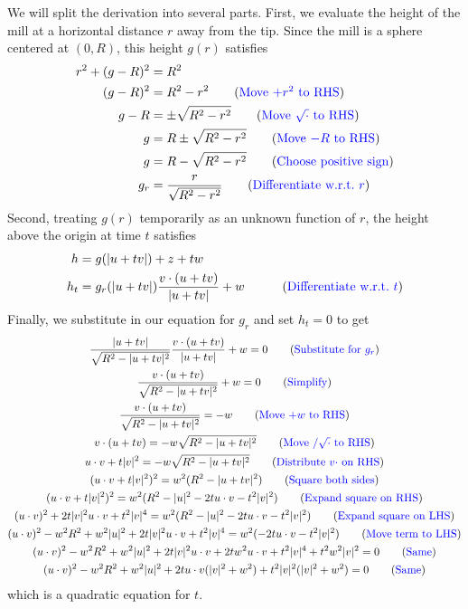 \documentclass[11pt]{article}
\newcommand{\blue}[1]{{\color{blue} #1}}
\newcommand{\move}[1]{\tag{\blue{#1}}}
\begin{document}
We will split the derivation into several parts.  First, we evaluate the height of the mill at a horizontal
distance $r$ away from the tip.  Since the mill is a sphere centered at $(0,R)$, this height $g(r)$ satisfies
\begin{align*}
r^2 + (g - R)^2 &= R^2 \\
(g - R)^2 &= R^2 - r^2 \move{Move $+r^2$ to RHS} \\
g - R &= \pm \sqrt{R^2 - r^2} \move{Move $\sqrt{\cdot}$ to RHS}\\
g &= R \pm \sqrt{R^2 - r^2} \move{Move $-R$ to RHS} \\
g &= R - \sqrt{R^2 - r^2} \move{Choose positive sign} \\
g_r &= \frac{r}{\sqrt{R^2 - r^2}} \move{Differentiate w.r.t.\ $r$}
\end{align*}
Second, treating $g(r)$ temporarily as an unknown function of $r$, the height above the origin at time $t$
satisfies
\begin{align*}
h &= g(|u+tv|) + z + tw \\
h_t &= g_r(|u+tv|) \frac{v \cdot (u + tv)}{|u+tv|} + w & \move{Differentiate w.r.t.\ $t$}
\end{align*}
Finally, we substitute in our equation for $g_r$ and set $h_t = 0$ to get
\begin{gather*}
\frac{|u+tv|}{\sqrt{R^2 - |u+tv|^2}} \frac{v \cdot (u+tv)}{|u+tv|} + w = 0 \move{Substitute for $g_r$} \\
\frac{v \cdot (u+tv)}{\sqrt{R^2 - |u+tv|^2}} + w = 0  \move{Simplify} \\
\frac{v \cdot (u+tv)}{\sqrt{R^2 - |u+tv|^2}} = -w \move{Move $+w$ to RHS} \\
v \cdot (u+tv) = -w \sqrt{R^2 - |u+tv|^2} \move{Move $/ \sqrt{\cdot}$ to RHS} \\
u\cdot v+t|v|^2 = -w \sqrt{R^2 - |u+tv|^2} \move{Distribute $v \cdot$ on RHS} \\
(u\cdot v+t|v|^2)^2 = w^2 (R^2 - |u+tv|^2) \move{Square both sides} \\
(u\cdot v+t|v|^2)^2 = w^2 (R^2 - |u|^2 - 2tu\cdot v - t^2|v|^2) \move{Expand square on RHS} \\
(u\cdot v)^2+2t|v|^2 u \cdot v + t^2 |v|^4 = w^2 (R^2 - |u|^2 - 2tu\cdot v - t^2|v|^2) \move{Expand square on LHS} \\
(u\cdot v)^2-w^2 R^2 + w^2 |u|^2 +2t|v|^2 u \cdot v + t^2 |v|^4 = w^2 (- 2tu\cdot v - t^2|v|^2) \move{Move term to LHS} \\
(u\cdot v)^2-w^2 R^2 + w^2 |u|^2 + 2t|v|^2 u \cdot v + 2t w^2 u\cdot v + t^2 |v|^4 + t^2 w^2 |v|^2 = 0 \move{Same}\\
(u\cdot v)^2-w^2 R^2 + w^2 |u|^2 + 2t u \cdot v(|v|^2 + w^2) + t^2 |v|^2 (|v|^2 + w^2) = 0 \move{Same}
\end{gather*}
which is a quadratic equation for $t$.
\end{document}
